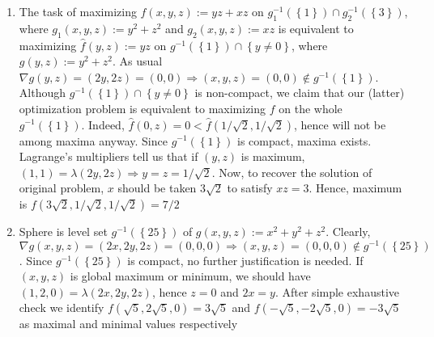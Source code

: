 \documentclass[8pt]{article} %
\newcommand{\myset}[1]{\left\{#1\right\}}
\begin{document}
\begin{enumerate}
{\begin{enumerate}[label=(\alph*)]
{			$(2x,2y,2z)=\lambda_1(3,1,-5)+\lambda_2(1,1,1)$, hence $2(x,y,z)\perp(0,-2,2)\Rightarrow
			2y+2z=0$. Having this knowledge and equation of two planes, we have linear system of 3 
			equations in 3 variables, which gives $(2,-1/2,-1/2)$ as the nearest to origin point on both planes.
		}
	\item{The task of maximizing $f(x,y,z):=yz+xz$ on $g_1^{-1}(\myset{1})\cap g_2^{-1}(\myset{3})$, where $g_1(x,y,z):=y^2+z^2$ and
		$g_2(x,y,z):=xz$ is equivalent to maximizing $\hat{f}(y,z):=yz$ on $g^{-1}(\myset{1})\cap\myset{y\neq 0}$, where $g(y,z):=y^2+z^2$. 
		As usual $\nabla g(y,z)=(2y,2z)=(0,0)\Rightarrow (x,y,z)=(0,0)\notin g^{-1}(\myset{1})$. Although $g^{-1}(\myset{1})\cap\myset{y\neq 0}$ is non-compact,
		we claim that our (latter) optimization problem is equivalent to maximizing $f$ on the whole $g^{-1}(\myset{1})$. Indeed, $\hat{f}(0,z)=0<\hat{f}(1/\sqrt{2},
		1/\sqrt{2})$, hence will not be among maxima anyway. Since $g^{-1}(\myset{1})$ is compact, maxima exists. Lagrange's multipliers tell us that if
		$(y,z)$ is maximum, $(1,1)=\lambda(2y,2z)\Rightarrow y=z=1/\sqrt{2}$. Now, to recover the solution of original problem, $x$ should be taken $3\sqrt{2}$ to
		satisfy $xz=3$. Hence, maximum is $f(3\sqrt{2},1/\sqrt{2},1/\sqrt{2})=7/2$
		}
	\item{Sphere is level set $g^{-1}(\myset{25})$ of $g(x,y,z):=x^2+y^2+z^2$. Clearly, $\nabla g(x,y,z)=(2x,2y,2z)=(0,0,0)\Rightarrow (x,y,z)=(0,0,0)\notin g^{-1}(\myset{
		25})$. Since $g^{-1}(\myset{25})$ is compact, no further justification is needed. If $(x,y,z)$ is global maximum or minimum, we should have
		$(1,2,0)=\lambda(2x,2y,2z)$, hence $z=0$ and $2x=y$. After simple exhaustive check we identify $f(\sqrt{5},2\sqrt{5},0)=3\sqrt{5}$ and
		$f(-\sqrt{5},-2\sqrt{5},0)=-3\sqrt{5}$ as maximal and minimal values respectively
		}
	\end{enumerate}
	}
\end{enumerate}
\end{document}
